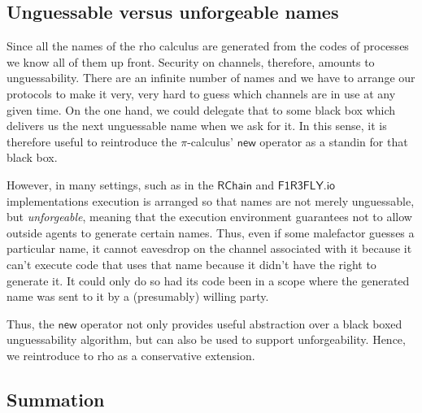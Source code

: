 \subsection{Unguessable versus unforgeable names}
Since all the names of the rho calculus are generated from the codes
of processes we know all of them up front. Security on channels,
therefore, amounts to unguessability. There are an infinite number of
names and we have to arrange our protocols to make it very, very hard
to guess which channels are in use at any given time. On the one hand,
we could delegate that to some black box which delivers us the next
unguessable name when we ask for it. In this sense, it is therefore
useful to reintroduce the $\pi$-calculus' $\mathsf{new}$ operator as a
standin for that black box.

However, in many settings, such as in the $\mathsf{RChain}$ and
$\mathsf{F1R3FLY.io}$ implementations execution is arranged so that
names are not merely unguessable, but \emph{unforgeable}, meaning that
the execution environment guarantees not to allow outside agents to
generate certain names. Thus, even if some malefactor guesses a
particular name, it cannot eavesdrop on the channel associated with it
because it can't execute code that uses that name because it didn't
have the right to generate it. It could only do so had its code been
in a scope where the generated name was sent to it by a (presumably)
willing party.

Thus, the $\mathsf{new}$ operator not only provides useful abstraction
over a black boxed unguessability algorithm, but can also be used to
support unforgeability. Hence, we reintroduce to rho as a conservative
extension.


\subsection{Summation}

